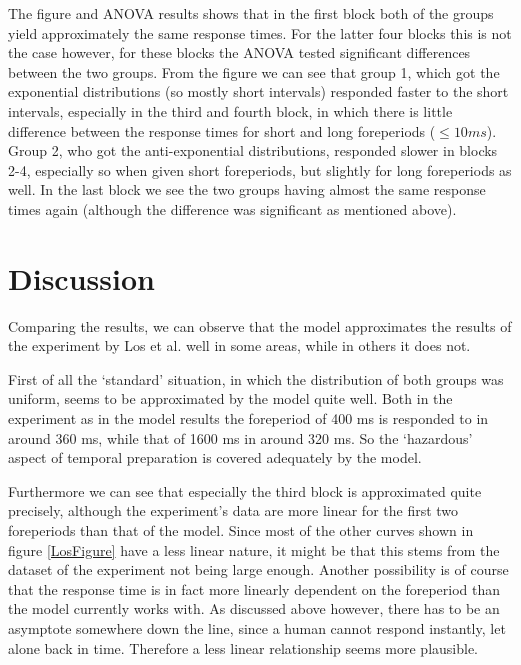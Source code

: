 \documentclass[10pt,letterpaper]{article}
\begin{document}
The figure and ANOVA results shows that in the first block both of the groups yield approximately the same response times. For the latter four blocks this is not the case however, for these blocks the ANOVA tested significant differences between the two groups. From the figure we can see that group 1, which got the exponential distributions (so mostly short intervals) responded faster to the short intervals, especially in the third and fourth block, in which there is little difference between the response times for short and long foreperiods ($\leq 10 ms$). Group 2, who got the anti-exponential distributions, responded slower in blocks 2-4, especially so when given short foreperiods, but slightly for long foreperiods as well. In the last block we see the two groups having almost the same response times again (although the difference was significant as mentioned above).

\section{Discussion}
Comparing the results, we can observe that the model approximates the results of the experiment by Los et al. well in some areas, while in others it does not.

First of all the `standard' situation, in which the distribution of both groups was uniform, seems to be approximated by the model quite well. Both in the experiment as in the model results the foreperiod of 400 ms is responded to in around 360 ms, while that of 1600 ms in around 320 ms. So the `hazardous' aspect of temporal preparation is covered adequately by the model.

Furthermore we can see that especially the third block is approximated quite precisely, although the experiment's data are more linear for the first two foreperiods than that of the model. Since most of the other curves shown in figure \ref{LosFigure} have a less linear nature, it might be that this stems from the dataset of the experiment not being large enough. Another possibility is of course that the response time is in fact more linearly dependent on the foreperiod than the model currently works with. As discussed above however, there has to be an asymptote somewhere down the line, since a human cannot respond instantly, let alone back in time. Therefore a less linear relationship seems more plausible. 
\end{document}
